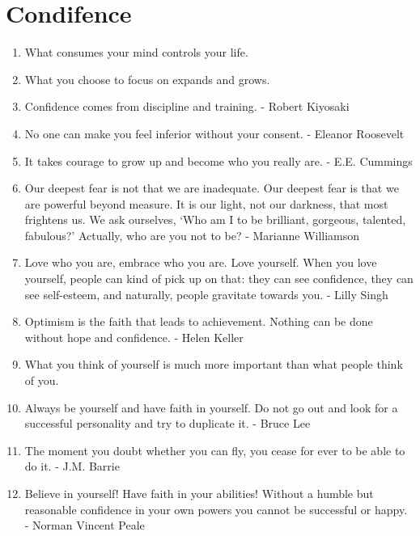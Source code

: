     \section*{Condifence}
        \begin{enumerate}
            \item What consumes your mind controls your life.

            \item What you choose to focus on expands and grows.

            \item Confidence comes from discipline and training. - Robert Kiyosaki

            \item No one can make you feel inferior without your consent. - Eleanor Roosevelt

            \item It takes courage to grow up and become who you really are. - E.E. Cummings

            \item Our deepest fear is not that we are inadequate. Our deepest fear is that we are powerful beyond measure. It is our light, not our darkness, that most frightens us. We ask ourselves, `Who am I to be brilliant, gorgeous, talented, fabulous?' Actually, who are you not to be? - Marianne Williamson

            \item Love who you are, embrace who you are. Love yourself. When you love yourself, people can kind of pick up on that: they can see confidence, they can see self-esteem, and naturally, people gravitate towards you. - Lilly Singh

            \item Optimism is the faith that leads to achievement. Nothing can be done without hope and confidence. - Helen Keller

            \item What you think of yourself is much more important than what people think of you.

            \item Always be yourself and have faith in yourself. Do not go out and look for a successful personality and try to duplicate it. - Bruce Lee

            \item The moment you doubt whether you can fly, you cease for ever to be able to do it. - J.M. Barrie

            \item Believe in yourself! Have faith in your abilities! Without a humble but reasonable confidence in your own powers you cannot be successful or happy. - Norman Vincent Peale


\end{enumerate}
